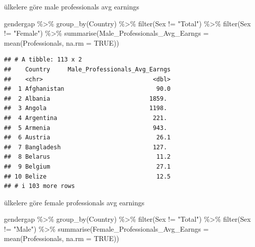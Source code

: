 \documentclass[
]{article}
\newenvironment{Shaded}{\begin{snugshade}}{\end{snugshade}}
\newcommand{\AttributeTok}[1]{\textcolor[rgb]{0.77,0.63,0.00}{#1}}
\newcommand{\ConstantTok}[1]{\textcolor[rgb]{0.00,0.00,0.00}{#1}}
\newcommand{\FunctionTok}[1]{\textcolor[rgb]{0.00,0.00,0.00}{#1}}
\newcommand{\NormalTok}[1]{#1}
\newcommand{\SpecialCharTok}[1]{\textcolor[rgb]{0.00,0.00,0.00}{#1}}
\newcommand{\StringTok}[1]{\textcolor[rgb]{0.31,0.60,0.02}{#1}}
\begin{document}
ülkelere göre male professionals avg earnings

\begin{Shaded}
\begin{Highlighting}[]
\NormalTok{gendergap }\SpecialCharTok{\%\textgreater{}\%}
  \FunctionTok{group\_by}\NormalTok{(Country) }\SpecialCharTok{\%\textgreater{}\%} 
   \FunctionTok{filter}\NormalTok{(Sex }\SpecialCharTok{!=} \StringTok{"Total"}\NormalTok{) }\SpecialCharTok{\%\textgreater{}\%}
  \FunctionTok{filter}\NormalTok{(Sex }\SpecialCharTok{!=} \StringTok{"Female"}\NormalTok{) }\SpecialCharTok{\%\textgreater{}\%}
  \FunctionTok{summarise}\NormalTok{(}\AttributeTok{Male\_Professionals\_Avg\_Earngs =} \FunctionTok{mean}\NormalTok{(Professionals, }\AttributeTok{na.rm =} \ConstantTok{TRUE}\NormalTok{))}
\end{Highlighting}
\end{Shaded}

\begin{verbatim}
## # A tibble: 113 x 2
##    Country     Male_Professionals_Avg_Earngs
##    <chr>                               <dbl>
##  1 Afghanistan                          90.0
##  2 Albania                            1859. 
##  3 Angola                             1198. 
##  4 Argentina                           221. 
##  5 Armenia                             943. 
##  6 Austria                              26.1
##  7 Bangladesh                          127. 
##  8 Belarus                              11.2
##  9 Belgium                              27.1
## 10 Belize                               12.5
## # i 103 more rows
\end{verbatim}

ülkelere göre female professionals avg earnings

\begin{Shaded}
\begin{Highlighting}[]
\NormalTok{gendergap }\SpecialCharTok{\%\textgreater{}\%}
  \FunctionTok{group\_by}\NormalTok{(Country) }\SpecialCharTok{\%\textgreater{}\%} 
   \FunctionTok{filter}\NormalTok{(Sex }\SpecialCharTok{!=} \StringTok{"Total"}\NormalTok{) }\SpecialCharTok{\%\textgreater{}\%}
  \FunctionTok{filter}\NormalTok{(Sex }\SpecialCharTok{!=} \StringTok{"Male"}\NormalTok{) }\SpecialCharTok{\%\textgreater{}\%}
  \FunctionTok{summarise}\NormalTok{(}\AttributeTok{Female\_Professionals\_Avg\_Earngs =} \FunctionTok{mean}\NormalTok{(Professionals, }\AttributeTok{na.rm =} \ConstantTok{TRUE}\NormalTok{))}
\end{Highlighting}
\end{Shaded}
\end{document}

